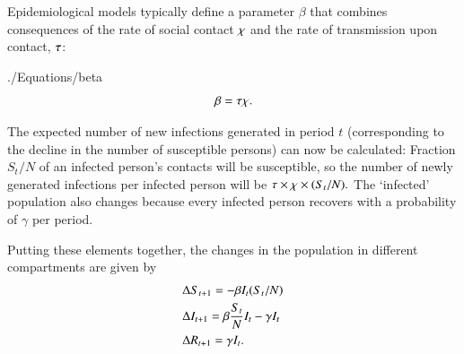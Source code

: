 Epidemiological models typically define a parameter $\beta$ that combines consequences of the rate of social contact $\contactNum$ and the rate of transmission upon  contact, $\tranProb$:
\begin{verbatimwrite}{./Equations/beta}
\begin{equation}
	\label{eq:beta}
    \beta  = \tranProb \contactNum.
\end{equation}
\end{verbatimwrite}


The expected number of new infections generated in period $t$ (corresponding to the decline in the number of susceptible persons) can now be calculated: Fraction $S_{t}/N$ of an infected person's contacts will be susceptible, so the number of newly generated infections per infected person will be $\tranProb \times \contactNum \times (S_{t}/N).$ The `infected' population also changes because every infected person recovers with a probability of $\gamma$ per period.

Putting these elements together, the  changes in the population in different compartments are given by
\begin{equation}
	\label{eq:sirdyn}
	\begin{split}
	&	\Delta S_{t+1} = -\beta I_{t}(S_{t}/N) \\
	&	\Delta I_{t+1} = \beta \frac{S_{t}}{N}I_{t} - \gamma I_t \\
&		\Delta \Recovered_{t+1} = \gamma I_t.
	\end{split}
\end{equation}



